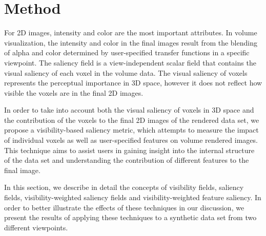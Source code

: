 \section{Method}
For 2D images, intensity and color are the most important attributes. In volume visualization, the intensity and color in the final images result from the blending of alpha and color determined by user-specified transfer functions in a specific viewpoint.
The saliency field is a view-independent scalar field that contains the visual saliency of each voxel in the volume data. The visual saliency of voxels represents the perceptual importance in 3D space, however it does not reflect how visible the voxels are in the final 2D images.

In order to take into account both the visual saliency of voxels in 3D space and the contribution of the voxels to the final 2D images of the rendered data set, we propose a visibility-based saliency metric, which attempts to measure the impact of individual voxels as well as user-specified features on volume rendered images.
This technique aims to assist users in gaining insight into the internal structure of the data set and understanding the contribution of different features to the final image.



In this section, we describe in detail the concepts of visibility fields, saliency fields, visibility-weighted saliency fields and visibility-weighted feature saliency. In order to better illustrate the effects of these techniques in our discussion, we present the results of applying these techniques to a synthetic data set from two different viewpoints.

